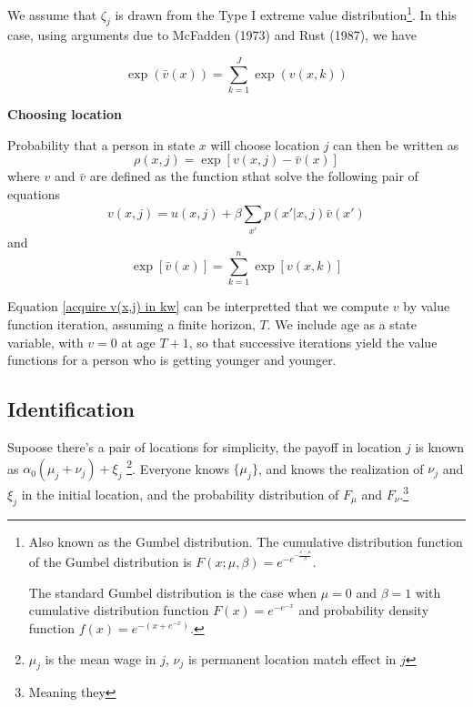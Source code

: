 \documentclass{article}
\numberwithin{equation}{section} %
\begin{document}
We assume that $\zeta_j$ is drawn from the Type I extreme value distribution\footnote{Also known as the Gumbel distribution. The cumulative distribution function of the Gumbel distribution is $F(x;\mu,\beta)=e^{-e^{-\frac{x-\mu}{\beta}}}$.

The standard Gumbel distribution is the case when $\mu=0$ and $\beta=1$ with cumulative distribution function $F(x)=e^{-e^{-x}}$ and probability density function ${f(x)=e^{-(x+e^{-x})}}$.}. In this case, using arguments due to McFadden (1973) and Rust (1987), we have

\begin{equation}
  \exp\left(\bar{v}(x)\right) = \sum_{k=1}^J \exp\left(v(x, k)\right)
\end{equation}

\textbf{Choosing location}

Probability that a person in state $x$ will choose location $j$ can then be written as
\begin{equation}
  \rho(x,j)=\exp[v(x,j)-\bar v(x)]
\end{equation}
where $v$ and $\bar v$ are defined as the function sthat solve the following pair of equations
\begin{equation}
  v(x,j)=u(x,j)+\beta \sum\limits_{x'}^{}p(x'|x,j)\bar v(x') \label{acquire v(x,j) in kw}
\end{equation}
and
\begin{equation}
  \exp[\bar v(x)]=\sum\limits_{k=1}^{n} \exp[v(x,k)]
\end{equation}

Equation \ref{acquire v(x,j) in kw} can be interpretted that we compute $v$ by value function iteration, assuming a finite horizon, $T$. We include age as a state variable, with $v=0$ at age $T+1$, so that successive iterations yield the value functions for a person who is getting younger and younger.


\subsection{Identification} %
\label{sub:identification}

Supoose there's a pair of locations for simplicity, the payoff in location $j$ is known as $\alpha_0(\mu_j+\nu_j)+\xi_j$ \footnote{$\mu_j$ is the mean wage in $j$, $\nu_j$ is permanent location match effect in $j$}. Everyone knows $\{\mu_j\}$, and knows the realization of $\nu_j$ and $\xi_j$ in the initial location, and the probability distribution of $F_\mu$ and $F_\nu$.\footnote{Meaning they }
\end{document}
